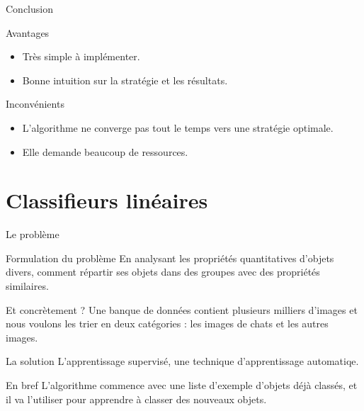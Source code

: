 \documentclass[serif]{beamer} %
\theoremstyle{definition}
\theoremstyle{remark}
\begin{document}
\begin{frame}{Conclusion}
	\begin{block}{Avantages}
		\begin{itemize}
			\pause
			\item Très simple à implémenter.
			\pause
			\item Bonne intuition sur la stratégie et les résultats.	
		\end{itemize}
	\end{block}
	\pause
	\begin{block}{Inconvénients}
	\begin{itemize}
		\pause
		\item L'algorithme ne converge pas tout le temps vers une stratégie optimale.
		\pause
		\item Elle demande beaucoup de ressources.		
	\end{itemize}
	\end{block}
\end{frame}

\section{Classifieurs linéaires}
\begin{frame}
	\tableofcontents[currentsection]
\end{frame}

\begin{frame}{Le problème}
	\pause
	\begin{block}{Formulation du problème}
		En analysant les propriétés quantitatives d'objets divers, comment répartir ses objets dans des groupes avec des propriétés similaires.
	\end{block}
	\pause
	\begin{block}{Et concrètement ?}
		Une banque de données contient plusieurs milliers d'images et nous voulons les trier en deux catégories : les images de chats et les autres images.
	\end{block}
\end{frame}

\begin{frame}{La solution}
	L'apprentissage supervisé, une technique d'apprentissage automatiqe.
	\pause
	\begin{block}{En bref}
		L'algorithme commence avec une liste d'exemple d'objets déjà classés, et il va l'utiliser pour apprendre à classer des nouveaux objets.
	\end{block}
\end{frame}
\end{document}
